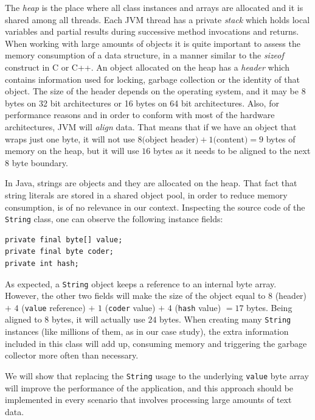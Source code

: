 \documentclass[a4paper,twoside]{article}
\begin{document}
The {\textit{heap}} is the place where all class instances and arrays are allocated and it is shared among all threads.
Each JVM thread has a private {\textit{stack}} which holds local variables and partial results  during successive method invocations and returns.
When working with large amounts of objects it is quite important to assess the memory consumption of a data structure, in a manner similar to the {\textit{sizeof}} construct in C or C++.
An object allocated on the heap has a {\textit{header}} which contains information used for locking, garbage collection or the identity of that object.
The size of the header depends on the operating system, and it may be 8 bytes on 32 bit architectures or 16 bytes on 64 bit architectures.
Also, for performance reasons and in order to conform with most of the hardware architectures, JVM will {\textit{align}} data.
That means that if we have an object that wraps just one byte, it will not use $8 \text{(object header)} + 1 \text{(content)} = 9 $ bytes of memory on the heap, but it will use $16$ bytes as it needs to be aligned to the next $8$ byte boundary.

In Java, strings are objects and they are allocated on the heap.
That fact that string literals are stored in a shared object pool, in order to reduce memory consumption, is of no relevance in our context.
Inspecting the source code of the \texttt{String} class, one can observe the following instance fields:
\begin{small}
\begin{verbatim}
private final byte[] value;
private final byte coder;
private int hash;
\end{verbatim}
\end{small}

As expected, a \texttt{String} object keeps a reference to an internal byte array.
However, the other two fields will make the size of the object equal to $8$ (header) $+$ $4$ (\texttt{value} reference) $+$ $1$  (\texttt{coder} value) $+$ $4$ (\texttt{hash} value) $= 17$ bytes.
Being aligned to $8$ bytes, it will actually use $24$ bytes.
When creating many \texttt{String} instances (like millions of them, as in our case study), the extra information included in this class will add up, consuming memory and  triggering the garbage collector more often than necessary. 

We will show that replacing the \texttt{String} usage to the underlying \texttt{value} byte array will improve the performance of the application, and this approach should be implemented in every scenario that involves processing large amounts of text data.
\end{document}
